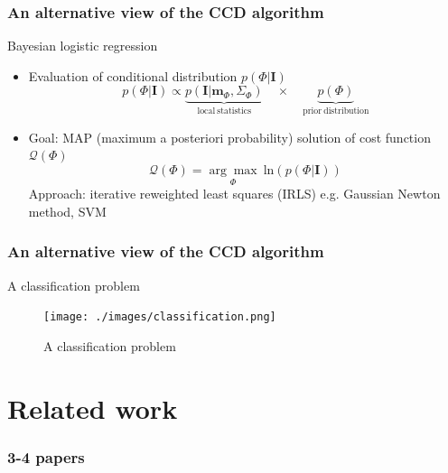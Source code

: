 \documentclass[english,10pt,presentation]{beamer}
\begin{document}
\begin{frame}
\frametitle{An alternative view of the CCD algorithm}
\label{sec-3_3}
\begin{exampleblock}{Bayesian logistic regression}
\label{sec-3_3_1}
\begin{itemize}

\item Evaluation of conditional distribution $p(\Phi|\mathbf{I})$
\label{sec-3_3_1_1}%
\begin{displaymath}
p(\Phi|\mathbf{I})
\propto \underbrace{p(\mathbf{I}|\mathbf{m}_{\Phi},
\Sigma_{\Phi})}_{\mathrm{local\ statistics}}\quad\times\quad
\underbrace{p(\Phi)}_{\mathrm{prior\ distribution}}
\end{displaymath}

\item Goal: MAP (maximum a posteriori probability) solution of cost function $\mathcal{Q}(\Phi)$
\label{sec-3_3_1_2}%
\begin{displaymath}
\mathcal{Q}(\Phi) = \underset{\Phi}{\arg\max}\ \mathrm{ln}(p(\Phi|\mathbf{I}))
\end{displaymath}
Approach: iterative reweighted least  squares (IRLS) e.g. Gaussian
Newton method, SVM
\end{itemize} %
\end{exampleblock}
\end{frame}
\begin{frame}
\frametitle{An alternative view of the CCD algorithm}
\label{sec-3_4}
\begin{exampleblock}{A classification problem}
\label{sec-3_4_1}

    \begin{figure}[htb]
    \centering
    \texttt{[image: ./images/classification.png]}
    \caption{\label{fig:class}A classification problem}
    \end{figure}
\end{exampleblock}
\end{frame}
\section{Related work}
\label{sec-4}
\begin{frame}
\frametitle{3-4 papers}
\label{sec-4_1}
\end{frame}
\end{document}
